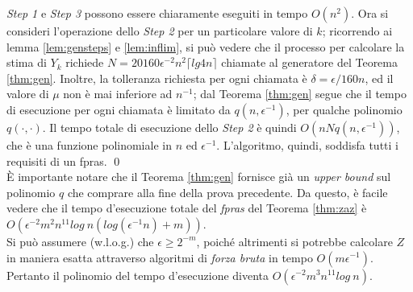 \textit{Step 1} e \textit{Step 3} possono essere chiaramente eseguiti in tempo $O(n^2)$. Ora si consideri l'operazione dello \textit{Step 2} per un particolare valore di $k$; ricorrendo ai lemma \ref{lem:gensteps} e \ref{lem:inflim}, si può vedere che il processo per calcolare la stima di $Y_k$ richiede $N = 20160\epsilon^{-2}n^2\lceil lg4n \rceil$ chiamate al generatore del Teorema \ref{thm:gen}. Inoltre, la tolleranza richiesta per ogni chiamata è $\delta = \epsilon /160n$, ed il valore di $\mu$ non è mai inferiore ad $n^{-1}$; dal Teorema \ref{thm:gen} segue che il tempo di esecuzione per ogni chiamata è limitato da $q(n, \epsilon^{-1})$, per qualche polinomio $q(\cdot, \cdot)$. Il tempo totale di esecuzione dello \textit{Step 2} è quindi $O(nNq(n, \epsilon^{-1}))$, che è una funzione polinomiale in $n$ ed $\epsilon^{-1}$. L'algoritmo, quindi, soddisfa tutti i requisiti di un fpras. \qed\\
È importante notare che il Teorema \ref{thm:gen} fornisce già un \textit{upper bound} sul polinomio $q$ che comprare alla fine della prova precedente. Da questo, è facile vedere che il tempo d'esecuzione totale del \textit{fpras} del Teorema \ref{thm:zaz} è $O(\epsilon^{-2}m^2n^{11}log\ n(log(\epsilon^{-1}n) + m))$.\\
Si può assumere (w.l.o.g.) che $\epsilon \geq 2^{-m}$, poiché altrimenti si potrebbe calcolare $Z$ in maniera esatta attraverso algoritmi di \textit{forza bruta} in tempo $O(m\epsilon^{-1})$. Pertanto il polinomio del tempo d'esecuzione diventa $O(\epsilon^{-2}m^3n^{11}log\ n)$.
